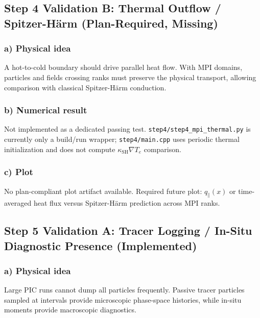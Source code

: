 \documentclass[11pt,a4paper]{article}
\begin{document}
\subsection{Step 4 Validation B: Thermal Outflow / Spitzer-H\"arm (Plan-Required, Missing)}

\subsubsection*{a) Physical idea}
A hot-to-cold boundary should drive parallel heat flow. With MPI domains, particles and fields crossing ranks must preserve the physical transport, allowing comparison with classical Spitzer-H\"arm conduction.

\subsubsection*{b) Numerical result}
Not implemented as a dedicated passing test. \texttt{step4/step4\_mpi\_thermal.py} is currently only a build/run wrapper; \texttt{step4/main.cpp} uses periodic thermal initialization and does not compute $\kappa_{\mathrm{SH}}\nabla T_e$ comparison.

\subsubsection*{c) Plot}
No plan-compliant plot artifact available. Required future plot: $q_\parallel(x)$ or time-averaged heat flux versus Spitzer-H\"arm prediction across MPI ranks.

\subsection{Step 5 Validation A: Tracer Logging / In-Situ Diagnostic Presence (Implemented)}

\subsubsection*{a) Physical idea}
Large PIC runs cannot dump all particles frequently. Passive tracer particles sampled at intervals provide microscopic phase-space histories, while in-situ moments provide macroscopic diagnostics.
\end{document}
